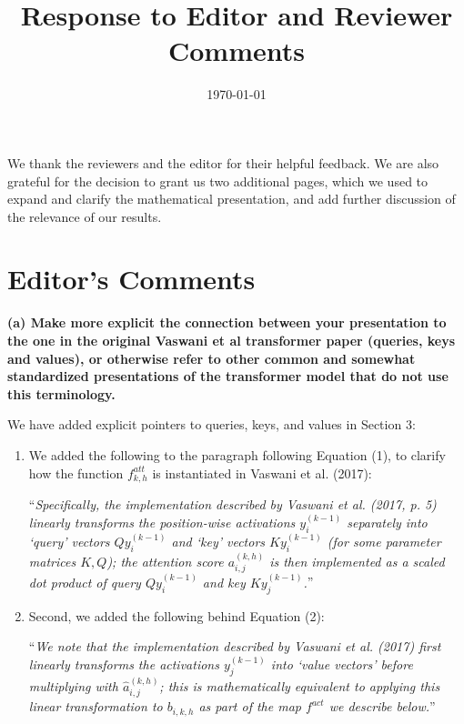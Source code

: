 \documentclass[11pt,a4paper]{article}
\title{Response to Editor and Reviewer Comments}
\date{\today}
\newcommand\response[1]{{\color{blue}#1}}
\newcommand\newtext[1]{``\textit{#1}''}
\newcommand\original[1]{\textbf{#1}}
\begin{document}
\maketitle 

\response{We thank the reviewers and the editor for their helpful feedback.
We are also grateful for the decision to grant us two additional pages, which we used to expand and clarify the mathematical presentation, and add further discussion of the relevance of our results.}

\section{Editor's Comments}

\original{(a) Make more explicit the connection between your presentation to the one
in the original Vaswani et al transformer paper (queries, keys and values),
or otherwise refer to other common and somewhat standardized presentations
of the transformer model that do not use this terminology.}

\response{We have added explicit pointers to queries, keys, and values in Section 3:}

\begin{enumerate}
    \item \response{We added the following to the paragraph following Equation (1), to clarify how the function $f^{att}_{k,h}$ is instantiated in Vaswani et al. (2017):}

\response{\newtext{Specifically, the implementation described by Vaswani et al. (2017, p. 5) linearly transforms the position-wise activations $y_i^{(k-1)}$ separately into `query' vectors $Q y_i^{(k-1)}$ and `key' vectors $K y_i^{(k-1)}$ (for some parameter matrices $K, Q$); the attention score $a_{i,j}^{(k,h)}$ is then implemented as a scaled dot product of query $Q y_i^{(k-1)}$ and key $K y_j^{(k-1)}$.}}
\newline

\item \response{Second, we added the following behind Equation (2):}

\response{\newtext{We note that the implementation described by Vaswani et al. (2017) first linearly transforms the activations $y_j^{(k-1)}$ into `value vectors' before multiplying with $ \hat{a}_{i,j}^{(k,h)}$; this is mathematically equivalent to applying this linear transformation to $b_{i,k,h}$ as part of the map $f^{act}$ we describe below.}}
\end{enumerate}
\end{document}
